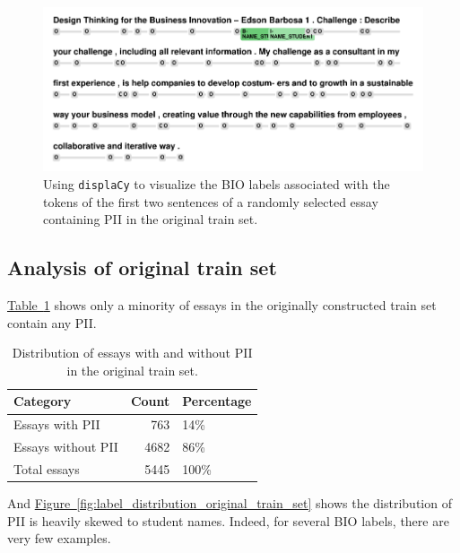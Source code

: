 \documentclass[11pt]{article}
\newcommand{\Tablink}[1]{\hyperref[#1]{Table~\ref*{#1}}}
\newcommand{\Figlink}[1]{\hyperref[#1]{Figure~\ref*{#1}}}
\begin{document}
\begin{figure}[t]
  \centering
  \includegraphics[width=1.0\linewidth]{images/label_visualization.pdf}
  \caption{Using \texttt{displaCy} to visualize the BIO labels associated with the tokens of the first two sentences of a randomly selected essay containing PII in the original train set.}
  \label{fig:label_visualization}
\end{figure}

\subsection{Analysis of original train set}

\Tablink{tab:pii_distribution_original_train_set} shows only a minority of essays in the originally constructed train set contain any PII.

\begin{table}[h!]
  \centering
  \caption{Distribution of essays with and without PII in the original train set.}
  \label{tab:pii_distribution_original_train_set}
  \begin{tabular}{lrl}
  \toprule
            Category &  Count & Percentage \\
  \midrule
     Essays with PII &    763 &        14\% \\
  Essays without PII &   4682 &        86\% \\
        Total essays &   5445 &       100\% \\
  \bottomrule
  \end{tabular}
\end{table}

And \Figlink{fig:label_distribution_original_train_set} shows the distribution of PII is heavily skewed to student names. Indeed, for several BIO labels, there are very few examples.
\end{document}
